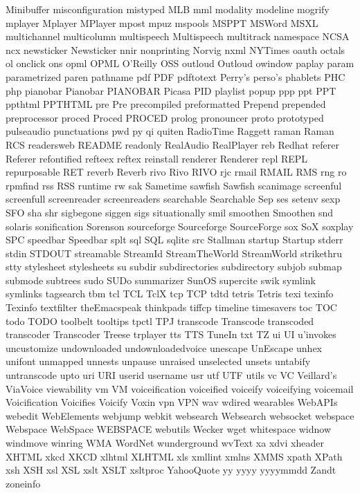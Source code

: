 Minibuffer
misconfiguration
mistyped
MLB
mml
modality
modeline
mogrify
mplayer
Mplayer
MPlayer
mpost
mpuz
mspools
MSPPT
MSWord
MSXL
multichannel
multicolumn
multispeech
Multispeech
multitrack
namespace
NCSA
ncx
newsticker
Newsticker
nnir
nonprinting
Norvig
nxml
NYTimes
oauth
octals
ol
onclick
ons
opml
OPML
O'Reilly
OSS
outloud
Outloud
owindow
paplay
param
parametrized
paren
pathname
pdf
PDF
pdftotext
Perry's
perso's
phablets
PHC
php
pianobar
Pianobar
PIANOBAR
Picasa
PID
playlist
popup
ppp
ppt
PPT
ppthtml
PPTHTML
pre
Pre
precompiled
preformatted
Prepend
prepended
preprocessor
proced
Proced
PROCED
prolog
pronouncer
proto
prototyped
pulseaudio
punctuations
pwd
py
qi
quiten
RadioTime
Raggett
raman
Raman
RCS
readersweb
README
readonly
RealAudio
RealPlayer
reb
Redhat
referer
Referer
refontified
refteex
reftex
reinstall
renderer
Renderer
repl
REPL
repurposable
RET
reverb
Reverb
rivo
Rivo
RIVO
rjc
rmail
RMAIL
RMS
rng
ro
rpmfind
rss
RSS
runtime
rw
sak
Sametime
sawfish
Sawfish
scanimage
screenful
screenfull
screenreader
screenreaders
searchable
Searchable
Sep
ses
setenv
sexp
SFO
sha
shr
sigbegone
siggen
sigs
situationally
smil
smoothen
Smoothen
snd
solaris
sonification
Sorenson
sourceforge
Sourceforge
SourceForge
sox
SoX
soxplay
SPC
speedbar
Speedbar
splt
sql
SQL
sqlite
src
Stallman
startup
Startup
stderr
stdin
STDOUT
streamable
StreamId
StreamTheWorld
StreamWorld
strikethru
stty
stylesheet
stylesheets
su
subdir
subdirectories
subdirectory
subjob
submap
submode
subtrees
sudo
SUDo
summarizer
SunOS
supercite
swik
symlink
symlinks
tagsearch
tbm
tcl
TCL
TclX
tcp
TCP
tdtd
tetris
Tetris
texi
texinfo
Texinfo
textfilter
theEmacspeak
thinkpads
tiffcp
timeline
timesavers
toc
TOC
todo
TODO
toolbelt
tooltips
tpctl
TPJ
transcode
Transcode
transcoded
transcoder
Transcoder
Treese
trplayer
tts
TTS
TuneIn
txt
TZ
ui
UI
u'invokes
uncustomize
undownloaded
undownloadedvoice
unescape
UnEscape
unhex
unifont
unmapped
unnests
unpause
unraised
unselected
unsets
untabify
untranscode
upto
uri
URI
userid
username
usr
utf
UTF
utils
vc
VC
Veillard's
ViaVoice
viewability
vm
VM
voiceification
voiceified
voiceify
voiceifying
voicemail
Voicification
Voicifies
Voicify
Voxin
vpn
VPN
wav
wdired
wearables
WebAPIs
webedit
WebElements
webjump
webkit
websearch
Websearch
websocket
webspace
Webspace
WebSpace
WEBSPACE
webutils
Wecker
wget
whitespace
widnow
windmove
winring
WMA
WordNet
wunderground
wvText
xa
xdvi
xheader
XHTML
xkcd
XKCD
xlhtml
XLHTML
xls
xmllint
xmlns
XMMS
xpath
XPath
xsh
XSH
xsl
XSL
xslt
XSLT
xsltproc
YahooQuote
yy
yyyy
yyyymmdd
Zandt
zoneinfo
